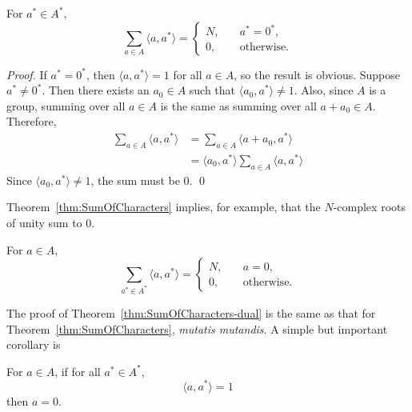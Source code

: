 \begin{theorem}\label{thm:SumOfCharacters}
For $a^*\in A^*$,
\[
\sum_{a\in A} \langle a,a^*\rangle 
= \left\{ \begin{array}{ll}
N, & \quad a^* = 0^*,\\
0, & \quad \text{otherwise}.
\end{array} \right.
\]
\end{theorem}
\begin{proof}
If $a^* = 0^*$, then $\langle a, a^* \rangle=1$ for all $a\in A$, so the
result is obvious.  Suppose $a^* \neq 0^*$.  Then there exists an $a_0 \in A$
such that $\langle a_0, a^* \rangle \neq 1$.  Also, since $A$ is a group,
summing over all $a\in A$ is the same as summing over all $a+a_0 \in A$.
Therefore,
\begin{align*} 
\sum_{a \in A}\langle a, a^* \rangle &= \sum_{a \in A}\langle a + a_0, a^* \rangle \\
&=\langle a_0, a^* \rangle \sum_{a \in A}\langle a, a^* \rangle
\end{align*}
Since $\langle a_0, a^* \rangle \neq 1$, the sum must be 0. \qed
\end{proof}
Theorem~\ref{thm:SumOfCharacters} implies, for example, that the
$N$-complex roots of unity sum to 0.
\begin{theorem}\label{thm:SumOfCharacters-dual}
For $a\in A$,
\[
\sum_{a^*\in A^*} \langle a,a^*\rangle 
= \left\{ \begin{array}{ll}
N, & \quad a = 0,\\
0, & \quad \text{otherwise}.
\end{array} \right.
\]
\end{theorem}
The proof of Theorem~\ref{thm:SumOfCharacters-dual} is the same as that for
Theorem~\ref{thm:SumOfCharacters}, {\it mutatis mutandis}.  A simple but
important corollary is 
\begin{corollary}\label{cor:zeroElement}
For $a\in A$, if for all $a^*\in A^*$,
\[
\langle a, a^* \rangle = 1
\]
then $a=0$.
\end{corollary}

